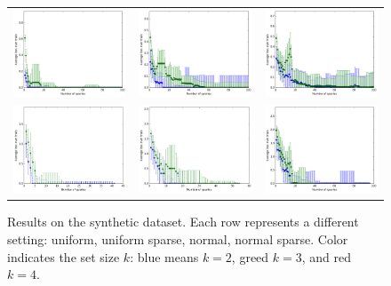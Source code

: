 \documentclass{article}
\renewcommand\[{\begin{equation}}
\renewcommand\]{\end{equation}}
\begin{document}
\begin{figure}[b]
\begin{tabular}{ccc}
        \\
        \includegraphics[width=12em]{figures/synthetic_3_normal} &
        \includegraphics[width=12em]{figures/synthetic_4_normal} &
        \includegraphics[width=12em]{figures/synthetic_5_normal}
        \\
        \includegraphics[width=12em]{figures/synthetic_3_normal_sparse} &
        \includegraphics[width=12em]{figures/synthetic_4_normal_sparse} &
        \includegraphics[width=12em]{figures/synthetic_5_normal_sparse}
    \end{tabular}
    \caption{Results on the synthetic dataset. Each row represents a different
    setting: uniform, uniform sparse, normal, normal sparse. Color indicates
    the set size $k$: blue means $k=2$, greed $k=3$, and red $k=4$.}
\end{figure}

\twocolumn
\end{document}
